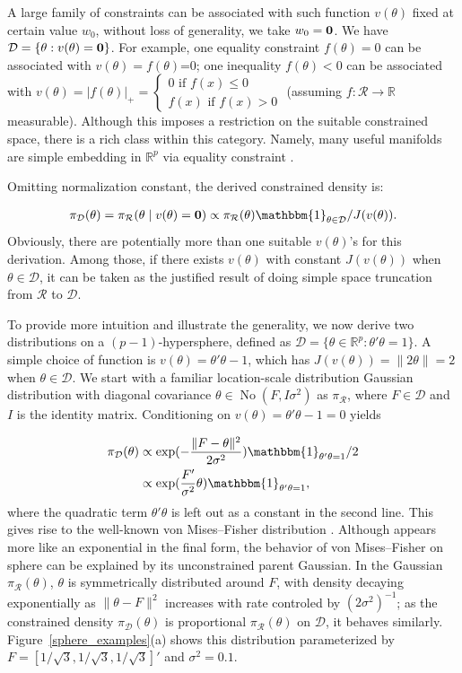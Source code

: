 \documentclass[10pt,fleqn]{article}
\newcommand{\be}{\begin{equation}\begin{aligned}}
\newcommand{\ee}{\end{aligned}\end{equation}}
\newcommand{\bb}[1]{\mathbb{#1}}
\newcommand{\mc}[1]{\mathcal{#1}}
\DeclareMathOperator{\No}{No}
\DeclareMathOperator{\1}{\mathbbm{1}}
\begin{document}
A large family of constraints can be
associated with such function $v(\theta)$ fixed at certain value $w_0$, without
loss of generality, we take $w_0=\bf 0$. We have
 $\mc D =\{\theta:
v(\theta)={\bf 0}\}$. For example, one
equality constraint $f(\theta)=0$ can be associated with $v(\theta)=f(\theta)$=0;
one inequality $f(\theta)<0$ can be associated with $v(\theta)=|f(\theta)|_+=\left\{\begin{array}{cc}  0 \text{ if } f(x)\le 0
\\ f(x) \text{ if } f(x)> 0\end{array}\right.$ (assuming $f:\mc R\rightarrow \bb R$  measurable). Although this imposes a
restriction  on the suitable constrained space, there is a rich class within this category. Namely, many useful manifolds are simple embedding in $\bb R^p$ via equality
constraint \citep{do2016differential}. 

Omitting normalization constant, the derived constrained density is:

\be
\label{constrainedDensity}
\pi_{\mc D}(\theta)=\pi_{\mc R}(\theta\mid v(\theta)={\bf 0})\propto \pi_{\mc R}(\theta) \mathbbm{1}_{\theta\in \mc
D}/J(v(\theta)).
\ee
Obviously, there are potentially more than one suitable $v(\theta)$'s for
this derivation. Among those, if there exists $v(\theta)$ with constant
$J(v(\theta))$ when $\theta\in\mc D$,
it can be taken as the justified result of doing simple space truncation
from $\mc R$ to $\mc D$.

 
To provide more intuition and illustrate the generality, we now derive two distributions on a $(p-1)$-hypersphere, defined as $\mc
D=\{\theta\in
\bb R^p:\theta'\theta=1\}$. A simple choice of  function is $v(\theta)=\theta'\theta-1$,
which has $J(v(\theta))=\|2\theta\|=2$ when $\theta\in \mc D$.
 We start with a familiar
location-scale distribution Gaussian distribution with diagonal
covariance $\theta \in \No(F,I\sigma^2)$ as $\pi_{\mc
R}$, where $F\in \mc D $ and $I$ is the identity matrix. Conditioning on $v(\theta)=\theta'\theta-1=0$ yields

\be
\pi_{\mc D}(\theta) &\propto
\exp(-\frac{\|F-\theta\|^2}{2\sigma^2})
\mathbbm{1}_{\theta'\theta=1}/2 \\
& \propto
\exp(\frac{F'}{\sigma^2}\theta)
\mathbbm{1}_{\theta'\theta=1}
,\ee
where the quadratic term $\theta'\theta$ is left out as a constant in the second line. This gives rise to the well-known von
Mises--Fisher distribution \citep{khatri1977mises}. Although appears more
like an exponential in the final form, the behavior of von
Mises--Fisher
on sphere can be explained by its unconstrained parent Gaussian.
In the Gaussian $\pi_{\mc
R}(\theta)$, $\theta$ is symmetrically distributed around $F$, with density
decaying exponentially as $\| \theta-F\|^2$ increases with rate controled by
$({2\sigma^2})^{-1}$; as the constrained
density $\pi_{\mc D}(\theta)$ is proportional $\pi_{\mc R}(\theta)$ on $\mc
D$, it behaves
similarly.  Figure~\ref{sphere_examples}(a) shows this distribution parameterized by $F=[1/\sqrt{3},1/\sqrt{3},1/\sqrt{3}]'$ and $\sigma^2=0.1$.
\end{document}
